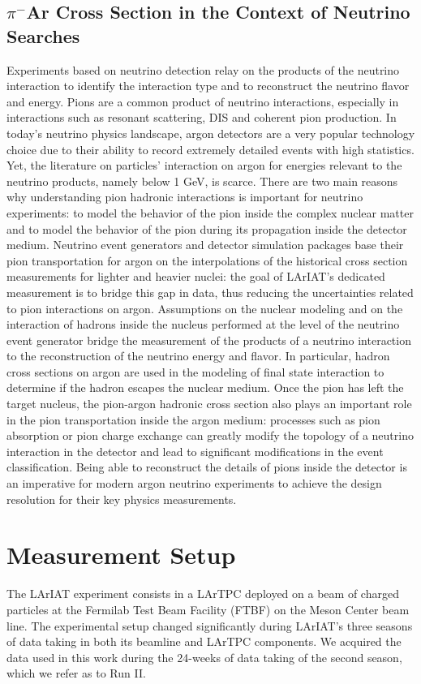 \documentclass[aps,prl,twocolumn,showpacs,superscriptaddress,groupedaddress]{revtex4}  %
\begin{document}
\subsection{$\pi^{-}$Ar Cross Section in the Context of Neutrino Searches}
Experiments based on neutrino detection relay on the products of the neutrino interaction to identify the interaction type and to reconstruct  the neutrino flavor and energy.  Pions are a common product of neutrino interactions, especially in interactions such as resonant scattering, DIS and coherent pion production.  In today's neutrino physics landscape, argon detectors are a very popular technology choice due to their ability to record extremely detailed events with high statistics. Yet, the literature on particles' interaction on argon for energies relevant to the neutrino products, namely below  1 GeV, is scarce. There are two main reasons why understanding pion hadronic interactions is important for neutrino experiments: to model the behavior of the pion inside the complex nuclear matter  and to model the behavior of the pion during its propagation inside the detector medium.  Neutrino event generators and detector simulation packages base their pion transportation for argon on the interpolations of the historical cross section measurements for lighter and heavier nuclei: the goal of LArIAT's dedicated measurement is to bridge this gap in data, thus reducing the uncertainties related to pion interactions on argon.
Assumptions on the nuclear modeling and on the interaction of hadrons inside the nucleus performed at the level of the neutrino event generator bridge the measurement of the products of a neutrino interaction to the reconstruction of the neutrino energy and flavor. In particular, hadron cross sections on argon are used in the modeling of final state interaction to determine if the hadron escapes the nuclear medium.
Once the pion has left the target nucleus, the pion-argon hadronic cross section also plays an important role in the pion transportation inside the argon medium: processes such as pion absorption or pion charge exchange can greatly modify the topology of a neutrino interaction	 in the detector and lead to significant modifications in the event classification.
Being able to reconstruct the details of pions inside the detector is an imperative for modern argon neutrino experiments to achieve the design resolution for their key physics measurements.





\section{\label{sec:ExperimentalSetup}Measurement Setup}
The LArIAT experiment consists in a LArTPC deployed on a beam of charged particles at the Fermilab Test Beam Facility (FTBF) on the  Meson Center beam line. The experimental setup changed significantly during LArIAT's three seasons of data taking in both its beamline and LArTPC components. We acquired the data used in this work  during the 24-weeks of data taking of the second season, which we refer as to Run II.  
\end{document}
